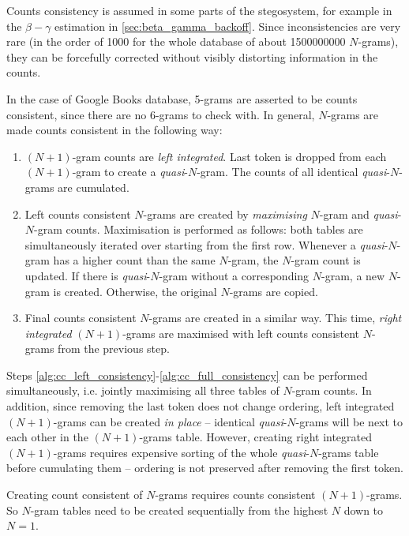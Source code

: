 \documentclass[draft]{IIBproject}
\makeatletter
\newcommand*{\ie}{i.e.\@\xspace}
\DeclareRobustCommand{\npgram}{\mbox{$(N{+}1)$-gram}\@\xspace}
\DeclareRobustCommand{\npgrams}{\mbox{$(N{+}1)$-grams}\@\xspace}
\makeatother
\begin{document}
Counts consistency is assumed in some parts of the stegosystem, for example in the $\beta{-}\gamma$ estimation in \cref{sec:beta_gamma_backoff}. Since inconsistencies are very rare (in the order of \num{1000} for the whole database of about \num{1500000000} $N$-grams), they can be forcefully corrected without visibly distorting information in the counts.

In the case of Google Books database, 5-grams are asserted to be counts consistent, since there are no 6-grams to check with. In general, $N$-grams are made counts consistent in the following way:

\begin{enumerate}
\item \label{alg:cc_left_integration} \npgram counts are \emph{left integrated}. Last token is dropped from each \npgram to create a \emph{quasi}-$N$-gram. The counts of all identical \emph{quasi}-$N$-grams are cumulated.
\item \label{alg:cc_left_consistency} Left counts consistent $N$-grams are created by \emph{maximising} $N$-gram and \emph{quasi}-$N$-gram counts. Maximisation is performed as follows: both tables are simultaneously iterated over starting from the first row. Whenever a \emph{quasi}-$N$-gram has a higher count than the same $N$-gram, the $N$-gram count is updated. If there is \emph{quasi}-$N$-gram without a corresponding $N$-gram, a new $N$-gram is created. Otherwise, the original $N$-grams are copied.
\item \label{alg:cc_full_consistency} Final counts consistent $N$-grams are created in a similar way. This time, \emph{right integrated} \npgrams are maximised with left counts consistent $N$-grams from the previous step.
\end{enumerate}

Steps \ref{alg:cc_left_consistency}-\ref{alg:cc_full_consistency} can be performed simultaneously, \ie jointly maximising all three tables of $N$-gram counts. In addition, since removing the last token does not change ordering, left integrated \npgrams can be created \emph{in place} -- identical \emph{quasi}-$N$-grams will be next to each other in the \npgrams table. However, creating right integrated \npgrams requires expensive sorting of the whole \emph{quasi}-$N$-grams table before cumulating them -- ordering is not preserved after removing the first token.

Creating count consistent of $N$-grams requires counts consistent \npgrams. So $N$-gram tables need to be created sequentially from the highest $N$ down to $N=1$.
\end{document}
